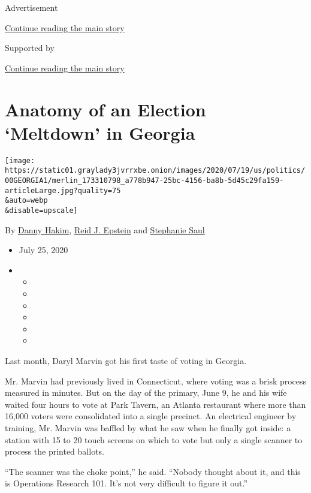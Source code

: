 Advertisement

\protect\hyperlink{after-top}{Continue reading the main story}

Supported by

\protect\hyperlink{after-sponsor}{Continue reading the main story}

\hypertarget{anatomy-of-an-election-meltdown-in-georgia}{%
\section{Anatomy of an Election `Meltdown' in
Georgia}\label{anatomy-of-an-election-meltdown-in-georgia}}

\texttt{[image: https://static01.graylady3jvrrxbe.onion/images/2020/07/19/us/politics/00GEORGIA1/merlin\_173310798\_a778b947-25bc-4156-ba8b-5d45c29fa159-articleLarge.jpg?quality=75\\\&auto=webp\\\&disable=upscale]}

By \href{https://www.nytimes3xbfgragh.onion/by/danny-hakim}{Danny
Hakim}, \href{https://www.nytimes3xbfgragh.onion/by/reid-j-epstein}{Reid
J. Epstein} and
\href{https://www.nytimes3xbfgragh.onion/by/stephanie-saul}{Stephanie
Saul}

\begin{itemize}
\item
  July 25, 2020
\item
  \begin{itemize}
  \item
  \item
  \item
  \item
  \item
  \item
  \end{itemize}
\end{itemize}

Last month, Daryl Marvin got his first taste of voting in Georgia.

Mr. Marvin had previously lived in Connecticut, where voting was a brisk
process measured in minutes. But on the day of the primary, June 9, he
and his wife waited four hours to vote at Park Tavern, an Atlanta
restaurant where more than 16,000 voters were consolidated into a single
precinct. An electrical engineer by training, Mr. Marvin was baffled by
what he saw when he finally got inside: a station with 15 to 20 touch
screens on which to vote but only a single scanner to process the
printed ballots.

``The scanner was the choke point,'' he said. ``Nobody thought about it,
and this is Operations Research 101. It's not very difficult to figure
it out.''

